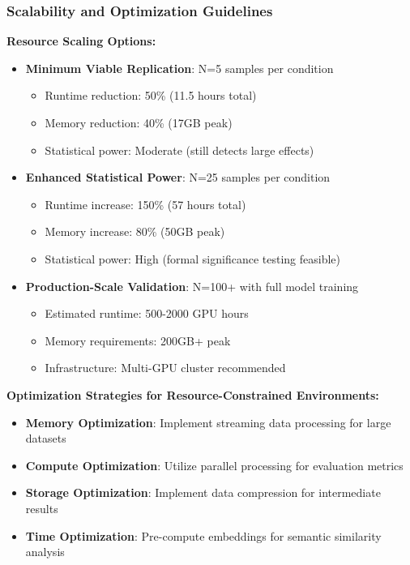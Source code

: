 \documentclass{article}
\begin{document}
\subsubsection{Scalability and Optimization Guidelines}

\textbf{Resource Scaling Options:}
\begin{itemize}
    \item \textbf{Minimum Viable Replication}: N=5 samples per condition
    \begin{itemize}
        \item Runtime reduction: 50\% (11.5 hours total)
        \item Memory reduction: 40\% (17GB peak)
        \item Statistical power: Moderate (still detects large effects)
    \end{itemize}
    \item \textbf{Enhanced Statistical Power}: N=25 samples per condition
    \begin{itemize}
        \item Runtime increase: 150\% (57 hours total)
        \item Memory increase: 80\% (50GB peak)
        \item Statistical power: High (formal significance testing feasible)
    \end{itemize}
    \item \textbf{Production-Scale Validation}: N=100+ with full model training
    \begin{itemize}
        \item Estimated runtime: 500-2000 GPU hours
        \item Memory requirements: 200GB+ peak
        \item Infrastructure: Multi-GPU cluster recommended
    \end{itemize}
\end{itemize}

\textbf{Optimization Strategies for Resource-Constrained Environments:}
\begin{itemize}
    \item \textbf{Memory Optimization}: Implement streaming data processing for large datasets
    \item \textbf{Compute Optimization}: Utilize parallel processing for evaluation metrics
    \item \textbf{Storage Optimization}: Implement data compression for intermediate results
    \item \textbf{Time Optimization}: Pre-compute embeddings for semantic similarity analysis
\end{itemize}
\end{document}
